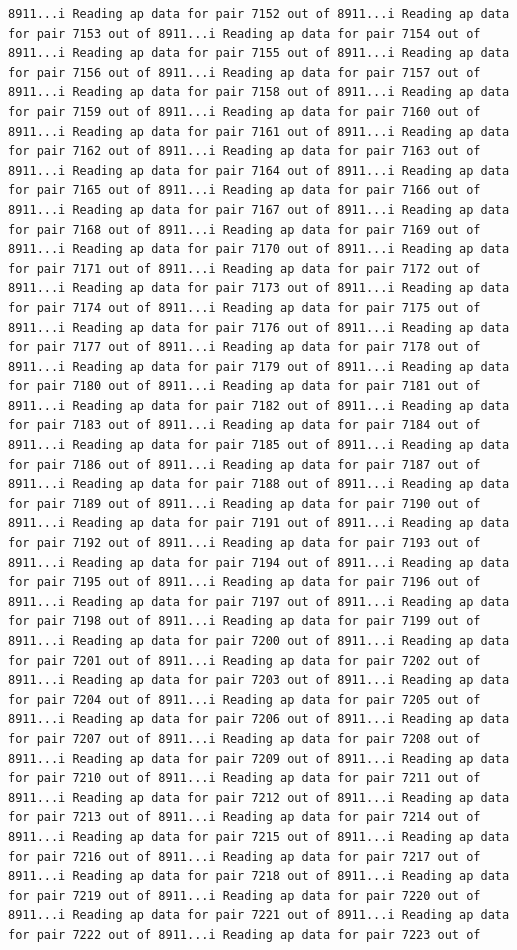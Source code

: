 \documentclass[
]{article}
\begin{document}
\begin{verbatim}
8911...i Reading ap data for pair 7152 out of 8911...i Reading ap data for pair 7153 out of 8911...i Reading ap data for pair 7154 out of 8911...i Reading ap data for pair 7155 out of 8911...i Reading ap data for pair 7156 out of 8911...i Reading ap data for pair 7157 out of 8911...i Reading ap data for pair 7158 out of 8911...i Reading ap data for pair 7159 out of 8911...i Reading ap data for pair 7160 out of 8911...i Reading ap data for pair 7161 out of 8911...i Reading ap data for pair 7162 out of 8911...i Reading ap data for pair 7163 out of 8911...i Reading ap data for pair 7164 out of 8911...i Reading ap data for pair 7165 out of 8911...i Reading ap data for pair 7166 out of 8911...i Reading ap data for pair 7167 out of 8911...i Reading ap data for pair 7168 out of 8911...i Reading ap data for pair 7169 out of 8911...i Reading ap data for pair 7170 out of 8911...i Reading ap data for pair 7171 out of 8911...i Reading ap data for pair 7172 out of 8911...i Reading ap data for pair 7173 out of 8911...i Reading ap data for pair 7174 out of 8911...i Reading ap data for pair 7175 out of 8911...i Reading ap data for pair 7176 out of 8911...i Reading ap data for pair 7177 out of 8911...i Reading ap data for pair 7178 out of 8911...i Reading ap data for pair 7179 out of 8911...i Reading ap data for pair 7180 out of 8911...i Reading ap data for pair 7181 out of 8911...i Reading ap data for pair 7182 out of 8911...i Reading ap data for pair 7183 out of 8911...i Reading ap data for pair 7184 out of 8911...i Reading ap data for pair 7185 out of 8911...i Reading ap data for pair 7186 out of 8911...i Reading ap data for pair 7187 out of 8911...i Reading ap data for pair 7188 out of 8911...i Reading ap data for pair 7189 out of 8911...i Reading ap data for pair 7190 out of 8911...i Reading ap data for pair 7191 out of 8911...i Reading ap data for pair 7192 out of 8911...i Reading ap data for pair 7193 out of 8911...i Reading ap data for pair 7194 out of 8911...i Reading ap data for pair 7195 out of 8911...i Reading ap data for pair 7196 out of 8911...i Reading ap data for pair 7197 out of 8911...i Reading ap data for pair 7198 out of 8911...i Reading ap data for pair 7199 out of 8911...i Reading ap data for pair 7200 out of 8911...i Reading ap data for pair 7201 out of 8911...i Reading ap data for pair 7202 out of 8911...i Reading ap data for pair 7203 out of 8911...i Reading ap data for pair 7204 out of 8911...i Reading ap data for pair 7205 out of 8911...i Reading ap data for pair 7206 out of 8911...i Reading ap data for pair 7207 out of 8911...i Reading ap data for pair 7208 out of 8911...i Reading ap data for pair 7209 out of 8911...i Reading ap data for pair 7210 out of 8911...i Reading ap data for pair 7211 out of 8911...i Reading ap data for pair 7212 out of 8911...i Reading ap data for pair 7213 out of 8911...i Reading ap data for pair 7214 out of 8911...i Reading ap data for pair 7215 out of 8911...i Reading ap data for pair 7216 out of 8911...i Reading ap data for pair 7217 out of 8911...i Reading ap data for pair 7218 out of 8911...i Reading ap data for pair 7219 out of 8911...i Reading ap data for pair 7220 out of 8911...i Reading ap data for pair 7221 out of 8911...i Reading ap data for pair 7222 out of 8911...i Reading ap data for pair 7223 out of 
\end{verbatim}
\end{document}
